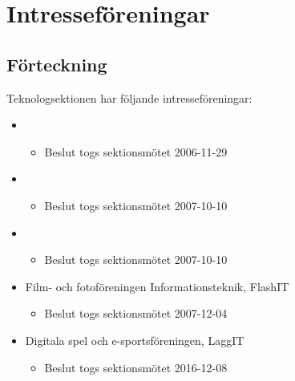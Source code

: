 \section{Intresseföreningar}

\subsection{Förteckning}

Teknologsektionen har följande intresseföreningar:

\begin{itemize}
	\item \EIGHTBITFULL{}
	\begin{itemize}
		\item Beslut togs sektionsmötet 2006-11-29
	\end{itemize}
	\item \DRAWITFULL{}
	\begin{itemize}
		\item Beslut togs sektionsmötet 2007-10-10
	\end{itemize}
	\item \HOOKITFULL{}
	\begin{itemize}
		\item Beslut togs sektionsmötet 2007-10-10
	\end{itemize}
	\item Film- och fotoföreningen Informationsteknik, FlashIT
	\begin{itemize}
		\item Beslut togs sektionsmötet 2007-12-04
	\end{itemize}
	\item Digitala spel och e-sportsföreningen, LaggIT
	\begin{itemize}
		\item Beslut togs sektionsmötet 2016-12-08
	\end{itemize}
\end{itemize}